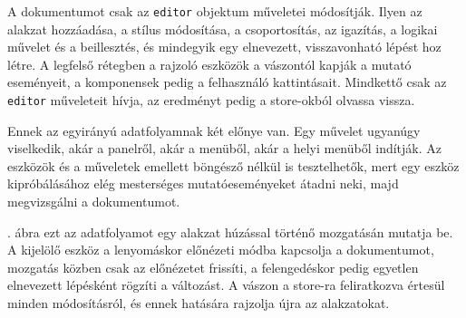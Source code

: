 A dokumentumot csak az \texttt{editor} objektum műveletei módosítják. Ilyen az alakzat hozzáadása, a stílus módosítása, a csoportosítás, az igazítás, a logikai művelet és a beillesztés, és mindegyik egy elnevezett, visszavonható lépést hoz létre. A legfelső rétegben a rajzoló eszközök a vászontól kapják a mutató eseményeit, a komponensek pedig a felhasználó kattintásait. Mindkettő csak az \texttt{editor} műveleteit hívja, az eredményt pedig a store-okból olvassa vissza.

Ennek az egyirányú adatfolyamnak két előnye van. Egy művelet ugyanúgy viselkedik, akár a panelről, akár a menüből, akár a helyi menüből indítják. Az eszközök és a műveletek emellett böngésző nélkül is tesztelhetők, mert egy eszköz kipróbálásához elég mesterséges mutatóeseményeket átadni neki, majd megvizsgálni a dokumentumot.

. ábra ezt az adatfolyamot egy alakzat húzással történő mozgatásán mutatja be. A kijelölő eszköz a lenyomáskor előnézeti módba kapcsolja a dokumentumot, mozgatás közben csak az előnézetet frissíti, a felengedéskor pedig egyetlen elnevezett lépésként rögzíti a változást. A vászon a store-ra feliratkozva értesül minden módosításról, és ennek hatására rajzolja újra az alakzatokat.

